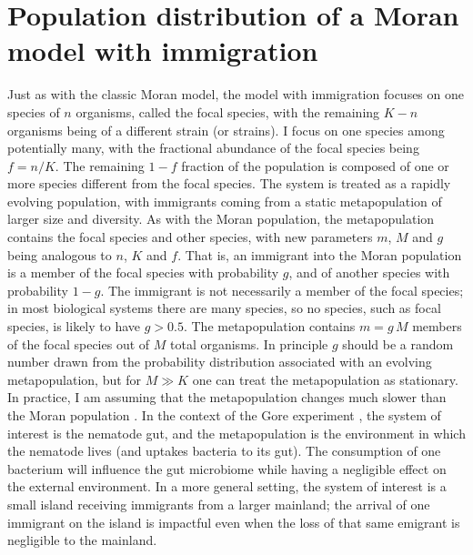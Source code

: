 \section{Population distribution of a Moran model with immigration}

Just as with the classic Moran model, the model with immigration focuses on one species of $n$ organisms, called the focal species, with the remaining $K-n$ organisms being of a different strain (or strains). 
I focus on one species among potentially many, with the fractional abundance of the focal species being $f=n/K$. 
The remaining $1-f$ fraction of the population is composed of one or more species different from the focal species. 
The system is treated as a rapidly evolving population, with immigrants coming from a static metapopulation of larger size and diversity. 
As with the Moran population, the metapopulation contains the focal species and other species, with new parameters $m$, $M$ and $g$ being analogous to $n$, $K$ and $f$. 
That is, an immigrant into the Moran population is a member of the focal species with probability $g$, and of another species with probability $1-g$. 
The immigrant is not necessarily a member of the focal species; in most biological systems there are many species, so no species, such as focal species, is likely to have $g>0.5$. 
The metapopulation contains $m = g\,M$ members of the focal species out of $M$ total organisms. 
In principle $g$ should be a random number drawn from the probability distribution associated with an evolving metapopulation, but for $M\gg K$ one can treat the metapopulation as stationary. 
In practice, I am assuming that the metapopulation changes much slower than the Moran population \cite{McKane2003}. %
In the context of the Gore experiment \cite{Vega2017}, the system of interest is the nematode gut, and the metapopulation is the environment in which the nematode lives (and uptakes bacteria to its gut). 
The consumption of one bacterium will influence the gut microbiome while having a negligible effect on the external environment. 
In a more general setting, the system of interest is a small island receiving immigrants from a larger mainland; the arrival of one immigrant on the island is impactful even when the loss of that same emigrant is negligible to the mainland. 

